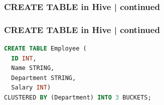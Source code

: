 \begin{frame}
\frametitle{CREATE TABLE in Hive | continued}
\begin{tcolorbox}[colback=white,colframe=black,title= Part 9: Clustering and Sorting | CLUSTERED BY]
	\small
	\vspace{.2cm}
	\begin{table}[h!]
		\centering
		\caption{Sample data for employee table}
	\end{table}
\end{tcolorbox}
\end{frame}
\begin{frame}[fragile]
\frametitle{CREATE TABLE in Hive | continued}	
\begin{tcolorbox}[colback=white,colframe=black,title= Part 9: Clustering and Sorting | CLUSTERED BY]
\small
\begin{lstlisting}[caption={Create CLUSTERED Table},language=SQL]
CREATE TABLE Employee (
  ID INT,
  Name STRING,
  Department STRING,
  Salary INT)
CLUSTERED BY (Department) INTO 3 BUCKETS;
\end{lstlisting}
\end{tcolorbox}
\end{frame}

